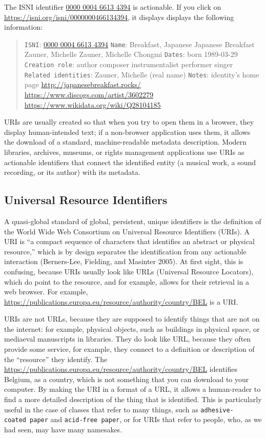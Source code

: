 \documentclass[
  letterpaper,
  DIV=11,
  numbers=noendperiod]{scrreprt}
\begin{document}
The ISNI identifier \href{https://isni.org/isni/0000000466134394}{0000
0004 6613 4394} is actionable. If you click on
\url{https://isni.org/isni/0000000466134394}, it displays displays the
following information:

\begin{quote}
\texttt{ISNI}: \href{https://isni.org/isni/0000000466134394}{0000 0004
6613 4394} \texttt{Name}: Breakfast, Japanese Japanese Breakfast Zauner,
Michelle Zauner, Michelle Chongmi \texttt{Dates}: born 1989-03-29
\texttt{Creation\ role}: author composer instrumentalist performer
singer \texttt{Related\ identities}: Zauner, Michelle (real name)
\texttt{Notes}: identity's home page
\url{http://japanesebreakfast.rocks/}
\url{https://www.discogs.com/artist/3602279}
\url{https://www.wikidata.org/wiki/Q28104185}
\end{quote}

URIs are usually created so that when you try to open them in a browser,
they display human-intended text; if a non-browser application uses
them, it allows the download of a standard, machine-readable metadata
description. Modern libraries, archives, museums, or rights management
applications use URIs as actionable identifiers that connect the
identified entity (a musical work, a sound recording, or its author)
with its metadata.

\subsection{Universal Resource
Identifiers}\label{universal-resource-identifiers}

A quasi-global standard of global, persistent, unique identifiers is the
definition of the World Wide Web Consortium on Universal Resource
Identifiers (URIs). A URI is ``a compact sequence of characters that
identifies an abstract or physical resource,'' which is by design
separates the identification from any actionable interaction
(Berners-Lee, Fielding, and Masinter 2005). At first sight, this is
confusing, because URIs usually look like URLs (Universal Resource
Locators), which do point to the resource, and for example, allows for
their retrieval in a web browser. For example,
\url{https://publications.europa.eu/resource/authority/country/BEL} is a
URI.

URIs are not URLs, because they are supposed to identify things that are
not on the internet: for example, physical objects, such as buildings in
physical space, or mediaeval manuscripts in libraries. They do look like
URL, because they often provide some service, for example, they connect
to a definition or description of the ``resource'' they identify. The
\url{https://publications.europa.eu/resource/authority/country/BEL}
identifies Belgium, as a country, which is not something that you can
download to your computer. By making the URI in a format of a URL, it
allows a human-reader to find a more detailed description of the thing
that is identified. This is particularly useful in the case of classes
that refer to many things, such as \texttt{adhesive-coated\ paper} and
\texttt{acid-free\ paper}, or for URIs that refer to people, who, as we
had seen, may have many namesakes.
\end{document}
